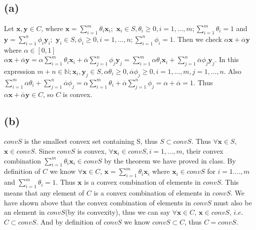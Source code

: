 \documentclass[12pt,letterpaper]{article}
\begin{document}
\section{}
\subsection*{(a)}
Let $\boldsymbol{x},\boldsymbol{y}\in C$, where $\boldsymbol{x}=\sum_{i=1}^{m}\theta_{i}\boldsymbol{x}_i;$ $\boldsymbol{x}_i\in S, \theta_i\geq0,i=1,\dots,m;\sum_{i=1}^{m}\theta_i=1$ and $\boldsymbol{y}=\sum_{i=1}^{n}\phi_{i}\boldsymbol{y}_i;$ $\boldsymbol{y}_i\in S, \phi_i\geq0,i=1,\dots,n;\sum_{i=1}^{n}\phi_i=1$. Then we check $\alpha\boldsymbol{x}+\overline{\alpha}\boldsymbol{y}$ where $\alpha \in [0,1]$\\
$\alpha\boldsymbol{x}+\overline{\alpha}\boldsymbol{y}=\alpha \sum_{i=1}^{m}\theta_{i}\boldsymbol{x}_i+\overline{\alpha}\sum_{j=1}^{n}\phi_{j}\boldsymbol{y}_j= \sum_{i=1}^{m}\alpha\theta_{i}\boldsymbol{x}_i+\sum_{j=1}^{n}\overline{\alpha}\phi_{j}\boldsymbol{y}_j$. In this expression $m+n\in \mathbb{N}; \boldsymbol{x}_i,\boldsymbol{y}_j\in S,\alpha\theta_i\geq0,\overline{\alpha}\phi_{j}\geq0,i=1,\dots,m,j=1,\dots,n$. Also $\sum_{i=1}^{m}\alpha\theta_i+\sum_{j=1}^{n}\overline{\alpha}\phi_{j}=\alpha\sum_{i=1}^{m}\theta_i+\overline{\alpha}\sum_{j=1}^{n}\phi_{j}=\alpha+\overline{\alpha}=1$. Thus $\alpha\boldsymbol{x}+\overline{\alpha}\boldsymbol{y}\in C$, so $C$ is convex.
\subsection*{(b)}
$convS$ is the smallest convex set containing S, thus $S\subset convS$. Thus $\forall\boldsymbol{x}\in S$, $\boldsymbol{x}\in convS$. Since $convS$ is convex, $\forall\boldsymbol{x}_i \in convS,i=1,\dots,m$, their convex combination $\sum_{i=1}^{m}\theta_{i}\boldsymbol{x}_i\in convS$ by the theorem we have proved in class. By definition of $C$ we know $\forall\boldsymbol{x}\in C$, $\boldsymbol{x}=\sum_{i=1}^{m}\theta_{i}\boldsymbol{x}_i$ where $\boldsymbol{x}_i\in convS$ for $i=1.\dots,m$ and $\sum_{i=1}^{m}\theta_{i}=1$. Thus $\boldsymbol{x}$ is a convex combination of elements in $convS$. This means that any element of $C$ is a convex combination of elements in $convS$. We have shown above that the convex combination of elements in $convS$ must also be an element in $convS$(by its convexity), thus we can say $\forall\boldsymbol{x}\in C$, $\boldsymbol{x}\in convS$, $i.e.$ $C\subset convS$. And by definition of $convS$ we know $convS\subset C$, thus $C=convS$.
\end{document}
